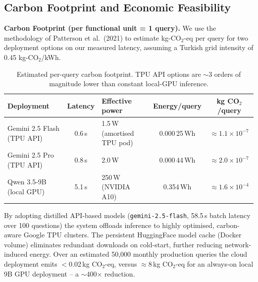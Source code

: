 \documentclass[11pt, a4paper]{article}
\begin{document}
\subsection{Carbon Footprint and Economic Feasibility}

\textbf{Carbon Footprint (per functional unit = 1 query).} We use the methodology of Patterson et al.\ (2021) to estimate kg-CO$_2$-eq per query for two deployment options on our measured latency, assuming a Turkish grid intensity of 0.45 kg-CO$_2$/kWh.

\begin{table}[H]
    \centering
    \footnotesize
    \caption{Estimated per-query carbon footprint. TPU API options are $\sim$3 orders of magnitude lower than constant local-GPU inference.}
    \label{tab:carbon}
    \begin{tabularx}{\textwidth}{@{}lcXcc@{}}
        \toprule
        \textbf{Deployment} & \textbf{Latency} & \textbf{Effective power} & \textbf{Energy/query} & \textbf{kg CO$_2$/query}\\
        \midrule
        Gemini 2.5 Flash (TPU API)  & 0.6\,s & 1.5\,W (amortised TPU pod) & 0.000\,25\,Wh & $\approx 1.1{\times}10^{-7}$\\
        Gemini 2.5 Pro (TPU API)    & 0.8\,s & 2.0\,W                      & 0.000\,44\,Wh & $\approx 2.0{\times}10^{-7}$\\
        Qwen 3.5-9B (local GPU)     & 5.1\,s & 250\,W (NVIDIA A10)          & 0.354\,Wh     & $\approx 1.6{\times}10^{-4}$\\
        \bottomrule
    \end{tabularx}
\end{table}

By adopting distilled API-based models (\texttt{gemini-2.5-flash}, 58.5\,s batch latency over 100 questions) the system offloads inference to highly optimised, carbon-aware Google TPU clusters. The persistent HuggingFace model cache (Docker volume) eliminates redundant downloads on cold-start, further reducing network-induced energy. Over an estimated 50{,}000 monthly production queries the cloud deployment emits $<$0.02\,kg CO$_2$-eq, versus $\approx$8\,kg CO$_2$-eq for an always-on local 9B GPU deployment -- a $\sim$400$\times$ reduction.
\end{document}
